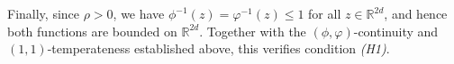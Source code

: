 \documentclass[a4paper,12pt]{article}
\let\originalleft\left
\let\originalright\right
\renewcommand{\left}{\mathopen{}\mathclose\bgroup\originalleft}
\renewcommand{\right}{\aftergroup\egroup\originalright}
\newcommand{\R}{\mathbb{R}}
\begin{document}
Finally, since $\rho>0$, we have $\phi^{-1}(z)=\varphi^{-1}(z)\le 1$ for all
$z\in\R^{2d}$, and hence both functions are bounded on $\R^{2d}$.
Together with the $(\phi,\varphi)$-continuity and $(1,1)$-temperateness
established above, this verifies condition \emph{(H1)}.

\end{document}

